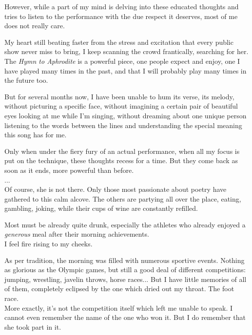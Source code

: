 \documentclass{report}
\begin{document}
However, while a part of my mind is delving into these educated thoughts and tries to listen to the performance with the due respect it deserves, most of me does not really care.

My heart still beating faster from the stress and excitation that every public show never miss to bring, I keep scanning the crowd frantically, searching for her.\\

The \emph{Hymn to Aphrodite} is a powerful piece, one people expect and enjoy, one I have played many times in the past, and that I will probably play many times in the future too.

But for several months now, I have been unable to hum its verse, its melody, without picturing a specific face, without imagining a certain pair of beautiful eyes looking at me while I'm singing, without dreaming about one unique person listening to the words between the lines and understanding the special meaning this song has for me.

Only when under the fiery fury of an actual performance, when all my focus is put on the technique, these thoughts recess for a time. But they come back as soon as it ends, more powerful than before.\\

...
\\

Of course, she is not there. Only those most passionate about poetry have gathered to this calm alcove. The others are partying all over the place, eating, gambling, joking, while their cups of wine are constantly refilled.

Most must be already quite drunk, especially the athletes who already enjoyed a \emph{generous} meal after their morning achievements.\\
 
I feel fire rising to my cheeks.

As per tradition, the morning was filled with numerous sportive events. Nothing as glorious as the Olympic games, but still a good deal of different competitions: jumping, wrestling, javelin throws, horse races... But I have little memories of all of them, completely eclipsed by the one which dried out my throat. The foot race.\\

More exactly, it's not the competition itself which left me unable to speak. I cannot even remember the name of the one who won it. But I do remember that she took part in it.
\end{document}
